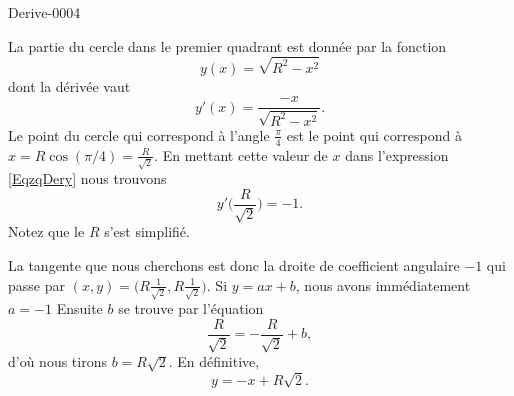 
\begin{corrige}{Derive-0004}

	La partie du cercle dans le premier quadrant est donnée par la fonction
	\begin{equation}
		y(x)=\sqrt{R^2-x^2}
	\end{equation}
	dont la dérivée vaut
	\begin{equation}		\label{EqzqDery}
		y'(x)=\frac{ -x }{ \sqrt{R^2-x^2} }.
	\end{equation}
	Le point du cercle qui correspond à l'angle $\frac{ \pi }{ 4 }$ est le point qui correspond à $x=R\cos(\pi/4)=\frac{ R }{ \sqrt{2} }$. En mettant cette valeur de $x$ dans l'expression \eqref{EqzqDery} nous trouvons
	\begin{equation}
		y'\big( \frac{ R }{ \sqrt{2} } \big)=-1.
	\end{equation}
	Notez que le $R$ s'est simplifié.

	La tangente que nous cherchons est donc la droite de coefficient angulaire $-1$ qui passe par $(x,y)=\big( R\frac{1}{ \sqrt{2} },R\frac{1}{ \sqrt{2} } \big)$. Si $y=ax+b$, nous avons immédiatement $a=-1$ Ensuite $b$ se trouve par l'équation
	\begin{equation}
		\frac{R}{ \sqrt{2} }=-\frac{R}{ \sqrt{2} }+b,
	\end{equation}
	d'où nous tirons $b=R\sqrt{2}$. En définitive,
	\begin{equation}
		y=-x+R\sqrt{2}.
	\end{equation}

\end{corrige}
